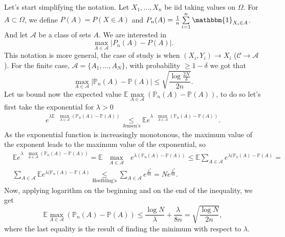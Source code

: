 \documentclass[11pt, english]{article}
\begin{document}
Let's start simplifying the notation. Let $X_1,\dots,X_n$ be iid taking values on $\Omega$. For $A\subset \Omega$, we define $P(A)=P(X\in A)$ and $P_n(A)=\frac{1}{n}\sum\limits_{i=1}^n\mathbbm{1}_{X_i\in A}$. And let $\mathcal{A}$ be a class of sets $A$. We are interested in 
\begin{equation}
	\underset{A\in\mathcal{A}}{\max}|P_n(A)-P(A)|.
\end{equation}
This notation is more general, the case of study is when $(X_i,Y_i)\rightarrow X_i$ ($\mathcal{C}\rightarrow \mathcal{A}$). For the finite case, $\mathcal{A}=\{A_1,\dots,A_N\}$, with probability $\geq 1-\delta$ we got that 
\begin{equation}
	\underset{A\in\mathcal{A}}{\max}|\mathbb{P}_n(A)-\mathbb{P}(A)|\leq\sqrt{\frac{\log\frac{2N}{\delta}}{2n}}.
\end{equation}
Let us bound now the expected value $\mathbb{E}\underset{A\in\mathcal{A}}{\max}(\mathbb{P}_n(A)-\mathbb{P}(A))$, to do so let's first take the exponential for $\lambda>0$
\begin{align}
	e^{\lambda\mathbb{E}\text{ }\underset{A\in\mathcal{A}}{\max}(\mathbb{P}_n(A)-\mathbb{P}(A))}\underset{\text{Jensen's}}{\leq}\mathbb{E}e^{\lambda\text{ }\underset{A\in\mathcal{A}}{\max}(\mathbb{P}_n(A)-\mathbb{P}(A))}.
\end{align}
As the exponential function is increasingly monotonous, the maximum value of the exponent leads to the maximum value of the exponential, so 
\begin{align}
	&\mathbb{E}e^{\lambda\text{ }\underset{A\in\mathcal{A}}{\max}(\mathbb{P}_n(A)-\mathbb{P}(A))}=\mathbb{E}\text{ }\underset{A\in\mathcal{A}}{\max}\text{ }e^{\lambda(\mathbb{P}_n(A)-\mathbb{P}(A))}\leq\mathbb{E}\sum\limits_{A\in\mathcal{A}}e^{\lambda(\mathbb{P}_n(A)-\mathbb{P}(A)}=\\
	&\sum\limits_{A\in\mathcal{A}}\mathbb{E}e^{\lambda(\mathbb{P}_n(A)-\mathbb{P}(A)}\underset{\text{Hoeffding's}}{\leq}\sum\limits_{A\in\mathcal{A}}e^{\frac{\lambda^2}{8n}}=Ne^{\frac{\lambda^2}{8n}}.
\end{align}
Now, applying logarithm on the beginning and on the end of the inequality, we get
\begin{equation}
	\mathbb{E}\underset{A\in\mathcal{A}}{\max}(\mathbb{P}_n(A)-\mathbb{P}(A))\leq\frac{\log N}{\lambda}+\frac{\lambda}{8n}=\sqrt{\frac{\log N}{2n}},
\end{equation}
where the last equality is the result of finding the minimum with respect to $\lambda$.\\
\end{document}
